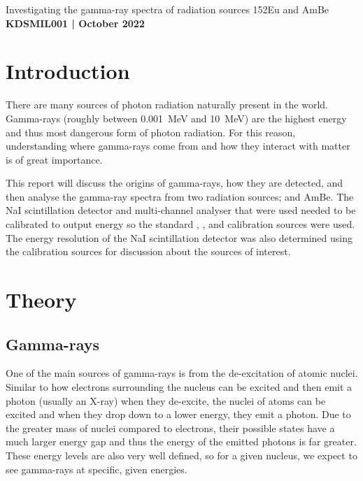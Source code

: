 \documentclass[11pt]{article}
\numberwithin{equation}{section}
\numberwithin{figure}{section}
\numberwithin{table}{section}
\begin{document}
\begin{center}
    {\huge Investigating the gamma-ray spectra of radiation sources 152Eu and AmBe}\\
    \vspace{0.2in}
    \textbf{KDSMIL001 | October 2022}
\end{center}


\section{Introduction}\label{sec:Introduction}
There are many sources of photon radiation naturally present in the world. Gamma-rays (roughly between \SI{0.001}{\mega\electronvolt} and \SI{10}{\mega\electronvolt}) are the highest energy and thus most dangerous form of photon radiation. For this reason, understanding where gamma-rays come from and how they interact with matter is of great importance. 

This report will discuss the origins of gamma-rays, how they are detected, and then analyse the gamma-ray spectra from two radiation sources;  and AmBe. The NaI scintillation detector and multi-channel analyser that were used needed to be calibrated to output energy so the standard , , and  calibration sources were used. The energy resolution of the NaI scintillation detector was also determined using the calibration sources for discussion about the sources of interest.

\section{Theory}\label{sec:Theory}

\subsection{Gamma-rays}\label{sec:GammaTheory}
One of the main sources of gamma-rays is from the de-excitation of atomic nuclei. Similar to how electrons surrounding the nucleus can be excited and then emit a photon (usually an X-ray) when they de-excite, the nuclei of atoms can be excited and when they drop down to a lower energy, they emit a photon. Due to the greater mass of nuclei compared to electrons, their possible states have a much larger energy gap and thus the energy of the emitted photons is far greater. These energy levels are also very well defined, so for a given nucleus, we expect to see gamma-rays at specific, given energies. 
\end{document}
